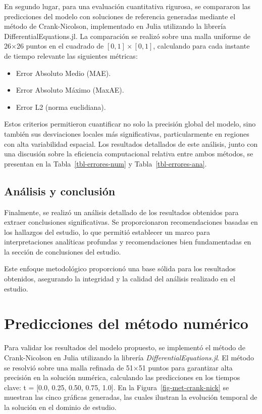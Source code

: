 \documentclass[
  spanish,
  us-letterpaper,
]{scrreprt}
\providecommand{\tightlist}{%
  \setlength{\itemsep}{0pt}\setlength{\parskip}{0pt}}
\theoremstyle{definition}
\theoremstyle{plain}
\theoremstyle{remark}
\begin{document}
En segundo lugar, para una evaluación cuantitativa rigurosa, se
compararon las predicciones del modelo con soluciones de referencia
generadas mediante el método de Crank-Nicolson, implementado en Julia
utilizando la librería DifferentialEquations.jl. La comparación se
realizó sobre una malla uniforme de 26×26 puntos en el cuadrado de
\([0,1]\times[0,1]\), calculando para cada instante de tiempo relevante
las siguientes métricas:

\begin{itemize}
\tightlist
\item
  Error Absoluto Medio (MAE).
\item
  Error Absoluto Máximo (MaxAE).
\item
  Error L2 (norma euclidiana).
\end{itemize}

Estos criterios permitieron cuantificar no solo la precisión global del
modelo, sino también sus desviaciones locales más significativas,
particularmente en regiones con alta variabilidad espacial. Los
resultados detallados de este análisis, junto con una discusión sobre la
eficiencia computacional relativa entre ambos métodos, se presentan en
la Tabla~\ref{tbl-errores-num} y Tabla~\ref{tbl-errores-ana}.

\section{Análisis y conclusión}\label{anuxe1lisis-y-conclusiuxf3n}

Finalmente, se realizó un análisis detallado de los resultados obtenidos
para extraer conclusiones significativas. Se proporcionaron
recomendaciones basadas en los hallazgos del estudio, lo que permitió
establecer un marco para interpretaciones analíticas profundas y
recomendaciones bien fundamentadas en la sección de conclusiones del
estudio.

Este enfoque metodológico proporcionó una base sólida para los
resultados obtenidos, asegurando la integridad y la calidad del análisis
realizado en el estudio.

\chapter{Predicciones del método
numérico}\label{predicciones-del-muxe9todo-numuxe9rico}

Para validar los resultados del modelo propuesto, se implementó el
método de Crank-Nicolson en Julia utilizando la librería
\emph{DifferentialEquations.jl}. El método se resolvió sobre una malla
refinada de 51×51 puntos para garantizar alta precisión en la solución
numérica, calculando las predicciones en los tiempos clave: t = {[}0.0,
0.25, 0.50, 0.75, 1.0{]}. En la Figura~\ref{fig-met-crank-nick} se
muestran las cinco gráficas generadas, las cuales ilustran la evolución
temporal de la solución en el dominio de estudio.
\end{document}
